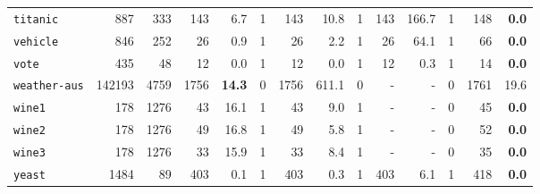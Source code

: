 \begin{tabular}{lccrrrrrrrrrrr}
\texttt{titanic} & \multicolumn{1}{r}{887} & \multicolumn{1}{r}{333}  & 143 & 6.7 & 1 & 143 & 10.8 & 1 & 143 & 166.7 & 1 & 148 & \textbf{0.0}\\
\texttt{vehicle} & \multicolumn{1}{r}{846} & \multicolumn{1}{r}{252}  & 26 & 0.9 & 1 & 26 & 2.2 & 1 & 26 & 64.1 & 1 & 66 & \textbf{0.0}\\
\texttt{vote} & \multicolumn{1}{r}{435} & \multicolumn{1}{r}{48}  & 12 & 0.0 & 1 & 12 & 0.0 & 1 & 12 & 0.3 & 1 & 14 & \textbf{0.0}\\
\texttt{weather-aus} & \multicolumn{1}{r}{142193} & \multicolumn{1}{r}{4759}  & 1756 & \textbf{14.3} & 0 & 1756 & 611.1 & 0 & - & - & 0 & 1761 & 19.6\\
\texttt{wine1} & \multicolumn{1}{r}{178} & \multicolumn{1}{r}{1276}  & 43 & 16.1 & 1 & 43 & 9.0 & 1 & - & - & 0 & 45 & \textbf{0.0}\\
\texttt{wine2} & \multicolumn{1}{r}{178} & \multicolumn{1}{r}{1276}  & 49 & 16.8 & 1 & 49 & 5.8 & 1 & - & - & 0 & 52 & \textbf{0.0}\\
\texttt{wine3} & \multicolumn{1}{r}{178} & \multicolumn{1}{r}{1276}  & 33 & 15.9 & 1 & 33 & 8.4 & 1 & - & - & 0 & 35 & \textbf{0.0}\\
\texttt{yeast} & \multicolumn{1}{r}{1484} & \multicolumn{1}{r}{89}  & 403 & 0.1 & 1 & 403 & 0.3 & 1 & 403 & 6.1 & 1 & 418 & \textbf{0.0}\\
\bottomrule
\end{tabular}
